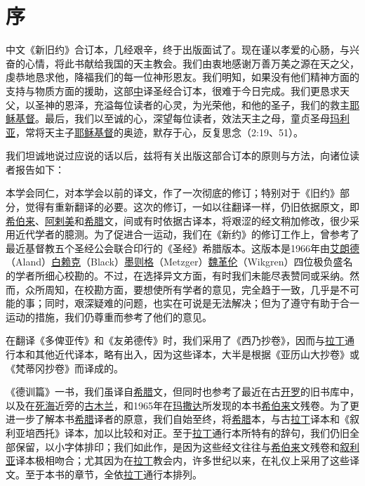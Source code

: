 \chapter*{序}


中文《新旧约》合订本，几经艰辛，终于出版面试了。现在谨以孝爱的心肠，与兴奋的心情，将此书献给我国的天主教会。我们由衷地感谢万善万美之源在天之父，虔恭地恳求他，降福我们的每一位神形恩友。我们明知，如果没有他们精神方面的支持与物质方面的援助，这部\uline{中}译圣经合订本，很难于今日完成。我们更恳求天父，以圣神的恩泽，充溢每位读者的心灵，为光荣他，和他的圣子，我们的救主\uline{耶稣}\uline{基督}。最后，我们以至诚的心，深望每位读者，效法天主之母，童贞圣母\uline{玛利亚}，常将天主子\uline{耶稣}\uline{基督}的奥迹，默存于心，反复思念（2:19、51）。

我们坦诚地说过应说的话以后，兹将有关出版这部合订本的原则与方法，向诸位读者报告如下：

本学会同仁，对本学会以前的译文，作了一次彻底的修订；特别对于《旧约》部分，觉得有重新翻译的必要。这次的修订，一如以往翻译一样，仍旧依据原文，即\uline{希伯来}、\uline{阿剌美}和\uline{希腊}文，间或有时依据古译本，将艰涩的经文稍加修改，很少采用近代学者的臆测。为了促进合一运动，我们在《新约》的修订工作上，曾参考了最近基督教五个圣经公会联合印行的《圣经》希腊版本。这版本是1966年由\uline{艾朗德}（Aland）\uline{白赖克}（Black）\uline{墨则格}（Metzger）\uline{魏革伦}（Wikgren）四位极负盛名的学者所细心校勘的。不过，在选择异文方面，有时我们未能尽表赞同或采纳。然而，众所周知，在校勘方面，要想使所有学者的意见，完全趋于一致，几乎是不可能的事；同时，艰深疑难的问题，也实在可说是无法解决；但为了遵守有助于合一运动的措施，我们仍尊重而参考了他们的意见。

在翻译《多俾亚传》和《友弟德传》时，我们采用了《西乃抄卷》，因而与\uline{拉丁}通行本和其他近代译本，略有出入，因为这些译本，大半是根据《亚历山大抄卷》或《梵蒂冈抄卷》而译成的。

《德训篇》一书，我们虽译自\uline{希腊}文，但同时也参考了最近在古\uline{开罗}的旧书库中，以及在\uline{死海}近旁的\uline{古木兰}，和1965年在\uline{玛撒达}所发现的本书\uline{希伯来}文残卷。为了更进一步了解本书\uline{希腊}译者的原意，我们自始至终，将\uline{希腊}本，与古\uline{拉丁}译本和《叙利亚培西托》译本，加以比较和对正。至于\uline{拉丁}通行本所特有的辞句，我们仍旧全部保留，以小字体排印；我们如此作，是因为这些经文往往与\uline{希伯来}文残卷和\uline{叙利亚}译本极相吻合；尤其因为在\uline{拉丁}教会内，许多世纪以来，在礼仪上采用了这些译文。至于本书的章节，全依\uline{拉丁}通行本排列。

